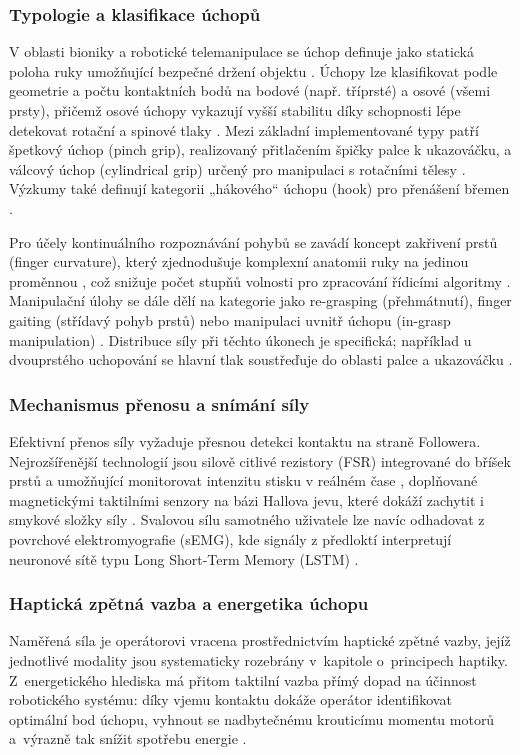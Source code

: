 \documentclass[FZS,DP]{tulthesis}
\begin{document}
\subsubsection{Typologie a klasifikace úchopů}
V oblasti bioniky a robotické telemanipulace se úchop definuje jako statická poloha ruky umožňující bezpečné držení objektu \cite{Nyrobtseva2018}. Úchopy lze klasifikovat podle geometrie a počtu kontaktních bodů na bodové (např. tříprsté) a osové (všemi prsty), přičemž osové úchopy vykazují vyšší stabilitu díky schopnosti lépe detekovat rotační a spinové tlaky \cite{Trajlinek2021}. Mezi základní implementované typy patří špetkový úchop (pinch grip), realizovaný přitlačením špičky palce k ukazováčku, a válcový úchop (cylindrical grip) určený pro manipulaci s rotačními tělesy \cite{Nyrobtseva2018}. Výzkumy také definují kategorii „hákového“ úchopu (hook) pro přenášení břemen \cite{Nyrobtseva2018, GIUDICI2025}.

Pro účely kontinuálního rozpoznávání pohybů se zavádí koncept zakřivení prstů (finger curvature), který zjednodušuje komplexní anatomii ruky na jedinou proměnnou \cite{GIUDICI2025}, což snižuje počet stupňů volnosti pro zpracování řídicími algoritmy \cite{Sun2023}. Manipulační úlohy se dále dělí na kategorie jako re-grasping (přehmátnutí), finger gaiting (střídavý pohyb prstů) nebo manipulaci uvnitř úchopu (in-grasp manipulation) \cite{GIUDICI2025}. Distribuce síly při těchto úkonech je specifická; například u dvouprstého uchopování se hlavní tlak soustřeďuje do oblasti palce a ukazováčku \cite{Nyrobtseva2018}.
\subsubsection{Mechanismus přenosu a snímání síly}
Efektivní přenos síly vyžaduje přesnou detekci kontaktu na straně Followera. Nejrozšířenější technologií jsou silově citlivé rezistory (FSR) integrované do bříšek prstů a umožňující monitorovat intenzitu stisku v reálném čase \cite{Nyrobtseva2018, Trajlinek2021}, doplňované magnetickými taktilními senzory na bázi Hallova jevu, které dokáží zachytit i smykové složky síly \cite{GIUDICI2025}. Svalovou sílu samotného uživatele lze navíc odhadovat z povrchové elektromyografie (sEMG), kde signály z předloktí interpretují neuronové sítě typu Long Short-Term Memory (LSTM) \cite{Sun2023}.
\subsubsection{Haptická zpětná vazba a energetika úchopu}
Naměřená síla je operátorovi vracena prostřednictvím haptické zpětné vazby, jejíž jednotlivé modality jsou systematicky rozebrány v~kapitole o~principech haptiky. Z~energetického hlediska má přitom taktilní vazba přímý dopad na účinnost robotického systému: díky vjemu kontaktu dokáže operátor identifikovat optimální bod úchopu, vyhnout se nadbytečnému krouticímu momentu motorů a~výrazně tak snížit spotřebu energie \cite{Papakonstantinou20251218}.
\end{document}
